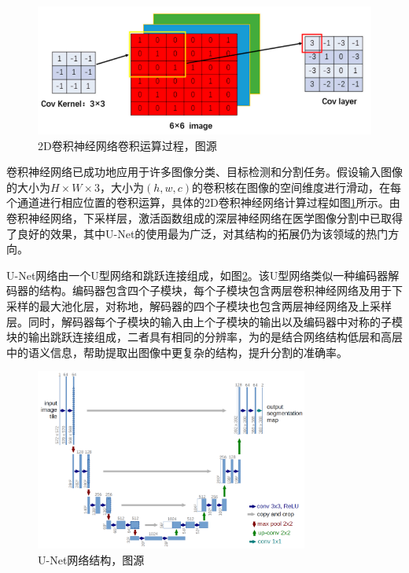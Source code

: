 \begin{figure}
    \centering
    \includegraphics[width=\textwidth]{image/chap01/cnn.png}
    \caption{2D卷积神经网络卷积运算过程，图源\cite{liu2021review}}
    \label{fig:cnn}
\end{figure}
卷积神经网络已成功地应用于许多图像分类、目标检测和分割任务。假设输入图像的大小为$H\times W\times 3$，大小为$(h, w, c)$的卷积核在图像的空间维度进行滑动，在每个通道进行相应位置的卷积运算，具体的2D卷积神经网络计算过程如图\ref{fig:cnn}所示。由卷积神经网络，下采样层，激活函数组成的深层神经网络在医学图像分割中已取得了良好的效果\cite{ronneberger2015u,chen2014semantic,badrinarayanan2017segnet}，其中U-Net\cite{ronneberger2015u}的使用最为广泛，对其结构的拓展仍为该领域的热门方向。

U-Net网络由一个U型网络和跳跃连接组成，如图\ref{fig:unet}。该U型网络类似一种编码器解码器的结构。编码器包含四个子模块，每个子模块包含两层卷积神经网络及用于下采样的最大池化层，对称地，解码器的四个子模块也包含两层神经网络及上采样层。同时，解码器每个子模块的输入由上个子模块的输出以及编码器中对称的子模块的输出跳跃连接组成，二者具有相同的分辨率，为的是结合网络结构低层和高层中的语义信息，帮助提取出图像中更复杂的结构，提升分割的准确率。
\begin{figure}
    \centering
    \includegraphics[width=0.8\textwidth]{image/chap01/u-net-architecture.png}
    \caption{U-Net网络结构，图源\cite{ronneberger2015u}}
    \label{fig:unet}
\end{figure}

